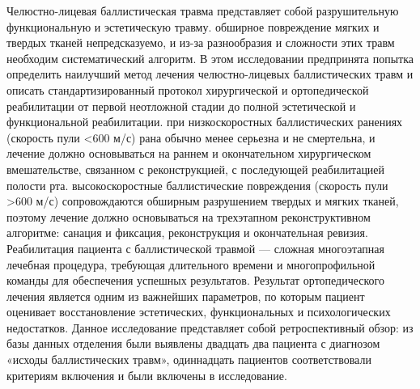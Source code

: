 Челюстно-лицевая баллистическая травма представляет собой разрушительную
функциональную и эстетическую травму. обширное повреждение мягких и твердых
тканей непредсказуемо, и из-за разнообразия и сложности этих травм необходим
систематический алгоритм. В этом исследовании предпринята попытка определить
наилучший метод лечения челюстно-лицевых баллистических травм и описать
стандартизированный протокол хирургической и ортопедической реабилитации от
первой неотложной стадии до полной эстетической и функциональной реабилитации.
при низкоскоростных баллистических ранениях (скорость пули <600 м/с) рана обычно
менее серьезна и не смертельна, и лечение должно основываться на раннем и
окончательном хирургическом вмешательстве, связанном с реконструкцией, с
последующей реабилитацией полости рта. высокоскоростные баллистические
повреждения (скорость пули >600 м/с) сопровождаются обширным разрушением твердых
и мягких тканей, поэтому лечение должно основываться на трехэтапном
реконструктивном алгоритме: санация и фиксация, реконструкция и окончательная
ревизия. Реабилитация пациента с баллистической травмой — сложная многоэтапная
лечебная процедура, требующая длительного времени и многопрофильной команды для
обеспечения успешных результатов. Результат ортопедического лечения является
одним из важнейших параметров, по которым пациент оценивает восстановление
эстетических, функциональных и психологических недостатков. Данное исследование
представляет собой ретроспективный обзор: из базы данных отделения были выявлены
двадцать два пациента с диагнозом «исходы баллистических травм», одиннадцать
пациентов соответствовали критериям включения и были включены в
исследование.\cite{35743719}

